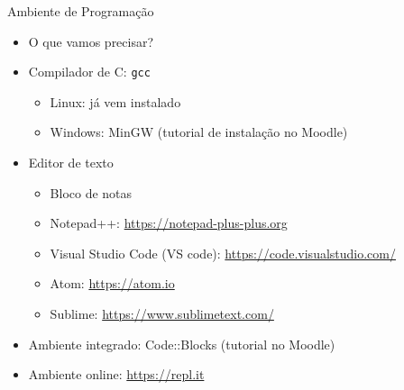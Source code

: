 \documentclass[t, aspectratio=169]{beamer}
\begin{document}
\begin{frame}[label={sec:org7c2c6d5},fragile]{Ambiente de Programação}
 \begin{itemize}
\item O que vamos precisar?

\item Compilador de C: \texttt{gcc}
\begin{itemize}
\item Linux: já vem instalado
\item Windows: MinGW (tutorial de instalação no Moodle)
\end{itemize}

\item Editor de texto
\begin{itemize}
\item Bloco de notas
\item Notepad++: \url{https://notepad-plus-plus.org}
\item Visual Studio Code (VS code): \url{https://code.visualstudio.com/}
\item Atom: \url{https://atom.io}
\item Sublime: \url{https://www.sublimetext.com/}
\end{itemize}

\item Ambiente integrado: Code::Blocks (tutorial no Moodle)
\item Ambiente online: \url{https://repl.it}
\end{itemize}
\end{frame}
\end{document}
